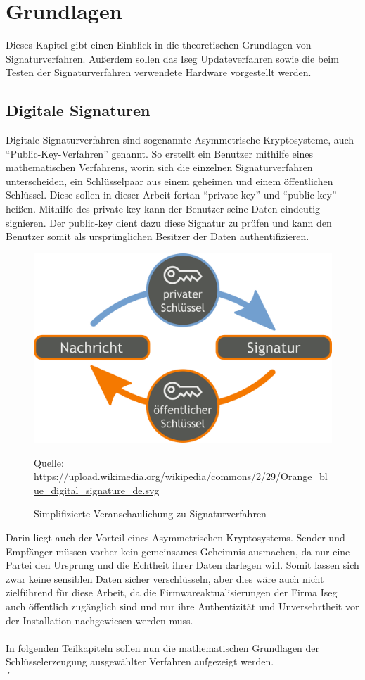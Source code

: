 \documentclass[thesis=bachelor,faculty=cb]{hsmw-thesis}
\begin{document}
\chapter{Grundlagen}
Dieses Kapitel gibt einen Einblick in die theoretischen Grundlagen von Signaturverfahren. Außerdem sollen das Iseg Updateverfahren sowie die beim Testen der Signaturverfahren verwendete Hardware vorgestellt werden.
\section{Digitale Signaturen}
Digitale Signaturverfahren sind sogenannte Asymmetrische Kryptosysteme, auch \enquote{Public-Key-Verfahren} genannt. So erstellt ein Benutzer mithilfe eines mathematischen Verfahrens, worin sich die einzelnen Signaturverfahren unterscheiden, ein Schlüsselpaar aus einem geheimen und einem öffentlichen Schlüssel. Diese sollen in dieser Arbeit fortan \enquote{private-key} und \enquote{public-key} heißen. Mithilfe des private-key kann der Benutzer seine Daten eindeutig signieren. Der public-key dient dazu diese Signatur zu prüfen und kann den Benutzer somit als ursprünglichen Besitzer der Daten authentifizieren. 
\begin{figure}[H]
	\centering
	\includegraphics[scale=0.09]{images/Orange_blue_digital_signature_de.svg.png}
	\caption{Simplifizierte Veranschaulichung zu Signaturverfahren}{Quelle: \url{ https://upload.wikimedia.org/wikipedia/commons/2/29/Orange_blue_digital_signature_de.svg}}
\end{figure}
Darin liegt auch der Vorteil eines Asymmetrischen Kryptosystems. Sender und Empfänger müssen vorher kein gemeinsames Geheimnis ausmachen, da nur eine Partei den Ursprung und die Echtheit ihrer Daten darlegen will. Somit lassen sich zwar keine sensiblen Daten sicher verschlüsseln, aber dies wäre auch nicht zielführend für diese Arbeit, da die Firmwareaktualisierungen der Firma Iseg auch öffentlich zugänglich sind und nur ihre Authentizität und Unversehrtheit vor der Installation nachgewiesen werden muss. \\
\\[1cm]
In folgenden Teilkapiteln sollen nun die mathematischen Grundlagen der Schlüsselerzeugung ausgewählter Verfahren aufgezeigt werden.
\\[1cm]´
\end{document}
